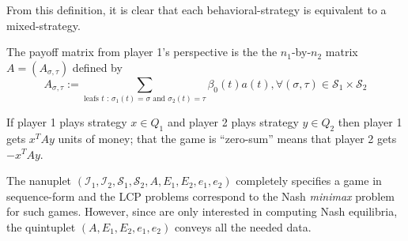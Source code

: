 \documentclass{article} %
\begin{document}
From this definition, it is clear that each behavioral-strategy is equivalent to a mixed-strategy.

The payoff matrix from player 1's perspective is the the $n_1$-by-$n_2$ matrix $A = (A_{\sigma,\tau})$ defined by
\begin{equation}
    A_{\sigma,\tau} := \sum_{\text{leafs }t\text{ : } \sigma_1(t) = \sigma\text{ and } \sigma_2(t) = \tau}{\beta_0(t)a(t)}, \forall (\sigma, \tau) \in \mathcal{S}_1 \times \mathcal{S}_2
  \end{equation}

If player 1 plays strategy $x \in Q_1$ and player 2 plays strategy $y \in Q_2$ then player 1 gets $x^TAy$ units of money; that the game is ``zero-sum'' means that player 2 gets $-x^TAy$.

The nanuplet $(\mathcal{I}_1, \mathcal{I}_2, \mathcal{S}_1, \mathcal{S}_2, A, E_1, E_2, e_1, e_2)$ completely specifies a game in sequence-form and the LCP problems correspond to the Nash \textit{minimax} problem for such games. However, since are only interested in computing Nash equilibria, the quintuplet $(A, E_1, E_2, e_1, e_2)$ conveys all the needed data.
\end{document}

